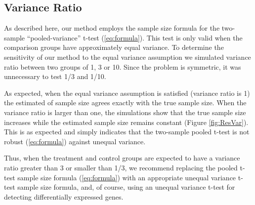 \documentclass{bioinfo}
\begin{document}
\subsection{Variance Ratio}

As described here, our method employs the sample size formula for
the two-sample ``pooled-variance'' t-test (\ref{eq:formula}).  This
test is only valid when the comparison groups have approximately
equal variance. To determine the sensitivity of our method to the
equal variance assumption we simulated variance ratio between two
groups of 1, 3 or 10.  Since the problem is symmetric, it was
unnecessary to test 1/3 and 1/10.  

As expected, when the equal variance assumption is satisfied
(variance ratio is 1) the estimated of sample size agrees exactly
with the true sample size. When the variance ratio is larger than
one, the simulations show that the true sample size increases while
the estimated sample size remains constant (Figure
\ref{fig:ResVar}).   This is as expected and simply indicates that
the two-sample pooled t-test is not robust (\ref{eq:formula})
against unequal variance.  

Thus, when the treatment and control groups are expected to have a
variance ratio greater than 3 or smaller than 1/3, we recommend
replacing the pooled t-test sample size formula (\ref{eq:formula})
with an appropriate unequal variance t-test sample size formula,
and, of course, using an unequal variance t-test for detecting
differentially expressed genes.
\end{document}
